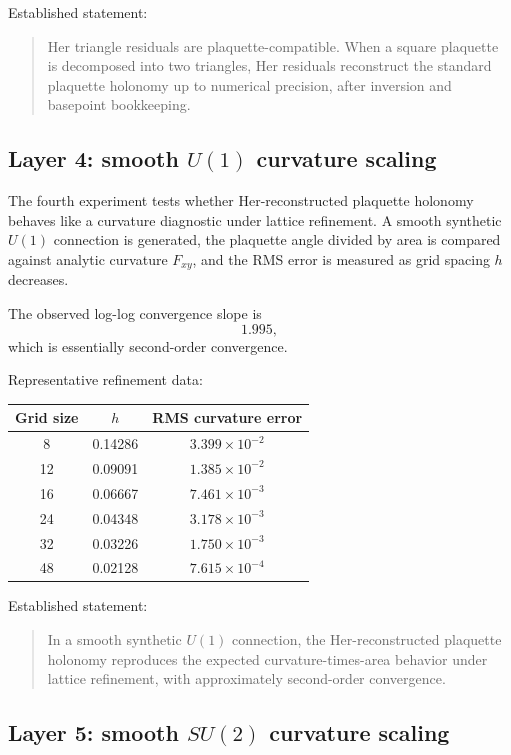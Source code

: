 \documentclass[11pt]{article}
\newcommand{\Uone}{U(1)}
\newcommand{\Sutwo}{SU(2)}
\newcommand{\Fxy}{F_{xy}}
\begin{document}
Established statement:
\begin{quote}
Her triangle residuals are plaquette-compatible.  When a square plaquette is decomposed into two triangles, Her residuals reconstruct the standard plaquette holonomy up to numerical precision, after inversion and basepoint bookkeeping.
\end{quote}

\subsection{Layer 4: smooth \(\Uone\) curvature scaling}

The fourth experiment tests whether Her-reconstructed plaquette holonomy behaves like a curvature diagnostic under lattice refinement.  A smooth synthetic \(\Uone\) connection is generated, the plaquette angle divided by area is compared against analytic curvature \(\Fxy\), and the RMS error is measured as grid spacing \(h\) decreases.

The observed log-log convergence slope is
\[
1.995,
\]
which is essentially second-order convergence.

Representative refinement data:
\begin{center}
\begin{tabular}{ccc}
\toprule
Grid size & \(h\) & RMS curvature error \\
\midrule
8  & 0.14286 & \(3.399\times 10^{-2}\) \\
12 & 0.09091 & \(1.385\times 10^{-2}\) \\
16 & 0.06667 & \(7.461\times 10^{-3}\) \\
24 & 0.04348 & \(3.178\times 10^{-3}\) \\
32 & 0.03226 & \(1.750\times 10^{-3}\) \\
48 & 0.02128 & \(7.615\times 10^{-4}\) \\
\bottomrule
\end{tabular}
\end{center}

Established statement:
\begin{quote}
In a smooth synthetic \(\Uone\) connection, the Her-reconstructed plaquette holonomy reproduces the expected curvature-times-area behavior under lattice refinement, with approximately second-order convergence.
\end{quote}

\subsection{Layer 5: smooth \(\Sutwo\) curvature scaling}
\end{document}

